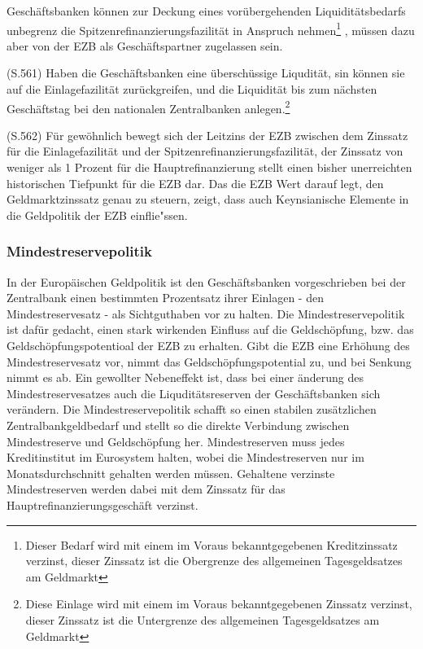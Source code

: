 \documentclass[
      onecolumn,
      a4paper,
      abstracton,
      parskip=half
      ,final
      ]{scrartcl}
\begin{document}
Gesch{\"a}ftsbanken k{\"o}nnen zur Deckung eines vor{\"u}bergehenden Liquidit{\"a}tsbedarfs unbegrenz die Spitzenrefinanzierungsfazilit{\"a}t in Anspruch nehmen\footnote[36]{Dieser Bedarf wird mit einem im Voraus bekanntgegebenen Kreditzinssatz verzinst, dieser Zinssatz ist die Obergrenze des allgemeinen Tagesgeldsatzes am Geldmarkt}
, m{\"u}ssen dazu aber von der EZB als Gesch{\"a}ftspartner zugelassen sein.

(S.561)
Haben die Gesch{\"a}ftsbanken eine {\"u}bersch{\"u}ssige Liqudit{\"a}t, sin k{\"o}nnen sie auf die Einlagefazilit{\"a}t zur{\"u}ckgreifen, und die Liquidit{\"a}t bis zum n{\"a}chsten Gesch{\"a}ftstag bei den nationalen Zentralbanken anlegen.\footnote[37]{Diese Einlage wird mit einem im Voraus bekanntgegebenen Zinssatz verzinst, dieser Zinssatz ist die Untergrenze des allgemeinen Tagesgeldsatzes am Geldmarkt}

(S.562)
F{\"u}r gew{\"o}hnlich bewegt sich der Leitzins der EZB zwischen dem Zinssatz f{\"u}r die Einlagefazilit{\"a}t und der Spitzenrefinanzierungsfazilit{\"a}t, der Zinssatz von weniger als 1 Prozent f{\"u}r die Hauptrefinanzierung stellt einen bisher unerreichten historischen Tiefpunkt f{\"u}r die EZB dar.
Das die EZB Wert darauf legt, den Geldmarktzinssatz genau zu steuern, zeigt, dass auch Keynsianische Elemente in die Geldpolitik der EZB einflie{"ss}en.

\subsubsection{Mindestreservepolitik}
In der Europ{\"a}ischen Geldpolitik ist den Gesch{\"a}ftsbanken  vorgeschrieben bei der Zentralbank einen bestimmten Prozentsatz ihrer Einlagen - den Mindestreservesatz -  als Sichtguthaben vor zu halten. Die Mindestreservepolitik ist daf{\"u}r gedacht, einen stark wirkenden Einfluss auf die Geldsch{\"o}pfung, bzw. das Geldsch{\"o}pfungspotentioal der EZB zu erhalten. Gibt die EZB eine Erh{\"o}hung des Mindestreservesatz vor, nimmt das Geldsch{\"o}pfungspotential zu, und  bei Senkung nimmt es ab. Ein gewollter Nebeneffekt ist, dass bei einer {\"a}nderung des Mindestreservesatzes auch die Liqudit{\"a}tsreserven der Gesch{\"a}ftsbanken sich ver{\"a}ndern.
Die Mindestreservepolitik schafft so einen stabilen zus{\"a}tzlichen Zentralbankgeldbedarf und stellt so die direkte Verbindung zwischen Mindestreserve und Geldsch{\"o}pfung her.
Mindestreserven muss jedes Kreditinstitut im Eurosystem halten, wobei die Mindestreserven nur im Monatsdurchschnitt gehalten werden m{\"u}ssen. Gehaltene verzinste Mindestreserven werden dabei mit dem Zinssatz f{\"u}r das Hauptrefinanzierungsgesch{\"a}ft verzinst.
\end{document}
